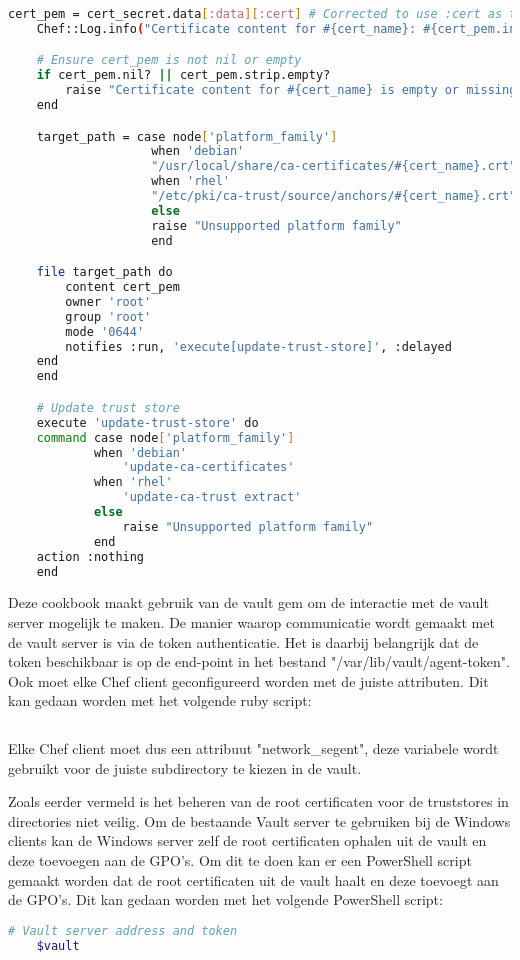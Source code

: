 \begin{lstlisting}[language=bash]
    cert_pem = cert_secret.data[:data][:cert] # Corrected to use :cert as the key
    Chef::Log.info("Certificate content for #{cert_name}: #{cert_pem.inspect}")

    # Ensure cert_pem is not nil or empty
    if cert_pem.nil? || cert_pem.strip.empty?
        raise "Certificate content for #{cert_name} is empty or missing"
    end

    target_path = case node['platform_family']
                    when 'debian'
                    "/usr/local/share/ca-certificates/#{cert_name}.crt"
                    when 'rhel'
                    "/etc/pki/ca-trust/source/anchors/#{cert_name}.crt"
                    else
                    raise "Unsupported platform family"
                    end

    file target_path do
        content cert_pem
        owner 'root'
        group 'root'
        mode '0644'
        notifies :run, 'execute[update-trust-store]', :delayed
    end
    end

    # Update trust store
    execute 'update-trust-store' do
    command case node['platform_family']
            when 'debian'
                'update-ca-certificates'
            when 'rhel'
                'update-ca-trust extract'
            else
                raise "Unsupported platform family"
            end
    action :nothing
    end
\end{lstlisting}

Deze cookbook maakt gebruik van de vault gem om de interactie met de vault server mogelijk te maken. De manier waarop communicatie wordt gemaakt met de vault server is via de token authenticatie. 
Het is daarbij belangrijk dat de token beschikbaar is op de end-point in het bestand "/var/lib/vault/agent-token".
Ook moet elke Chef client geconfigureerd worden met de juiste attributen. Dit kan gedaan worden met het volgende ruby script:
\begin{lstlisting}[language=bash]

\end{lstlisting}

Elke Chef client moet dus een attribuut "network_segent", deze variabele wordt gebruikt voor de juiste subdirectory te kiezen in de vault.

\label{sec:Oplossing voor Windows end-points met Vault}
Zoals eerder vermeld is het beheren van de root certificaten voor de truststores in directories niet veilig. Om de bestaande Vault server te gebruiken bij de Windows clients kan de Windows server zelf de root certificaten ophalen uit de vault en deze toevoegen aan de GPO's.
Om dit te doen kan er een PowerShell script gemaakt worden dat de root certificaten uit de vault haalt en deze toevoegt aan de GPO's. Dit kan gedaan worden met het volgende PowerShell script:
\begin{lstlisting}[language=bash]
    # Vault server address and token
    $vault
\end{lstlisting}


